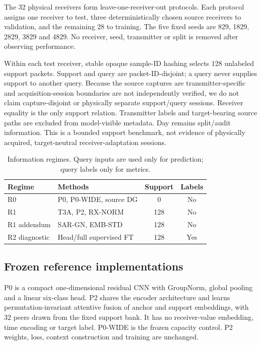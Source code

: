 The 32 physical receivers form leave-one-receiver-out protocols. Each protocol assigns one receiver to test, three deterministically chosen source receivers to validation, and the remaining 28 to training. The five fixed seeds are 829, 1829, 2829, 3829 and 4829. No receiver, seed, transmitter or split is removed after observing performance.

Within each test receiver, stable opaque sample-ID hashing selects 128 unlabeled support packets. Support and query are packet-ID-disjoint; a query never supplies support to another query. Because the source captures are transmitter-specific and acquisition-session boundaries are not independently verified, we do not claim capture-disjoint or physically separate support/query sessions. Receiver equality is the only support relation. Transmitter labels and target-bearing source paths are excluded from model-visible metadata. Day remains split/audit information. This is a bounded support benchmark, not evidence of physically acquired, target-neutral receiver-adaptation sessions.

\begin{table}[t]\centering\small
\caption{Information regimes. Query inputs are used only for prediction; query labels only for metrics.}
\begin{tabularx}{\columnwidth}{lXcc}
\toprule Regime & Methods & Support & Labels\\\midrule
R0 & P0, P0-WIDE, source DG & 0 & No\\
R1 & T3A, P2, RX-NORM & 128 & No\\
R1 addendum & SAR-GN, EMB-STD & 128 & No\\
R2 diagnostic & Head/full supervised FT & 128 & Yes\\\bottomrule
\end{tabularx}\label{tab:information}
\end{table}

\subsection{Frozen reference implementations}
P0 is a compact one-dimensional residual CNN with GroupNorm, global pooling and a linear six-class head. P2 shares the encoder architecture and learns permutation-invariant attentive fusion of anchor and support embeddings, with 32 peers drawn from the fixed support bank. It has no receiver-value embedding, time encoding or target label. P0-WIDE is the frozen capacity control. P2 weights, loss, context construction and training are unchanged.

